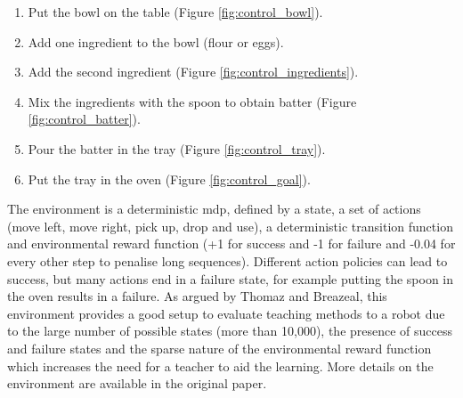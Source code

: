 \begin{enumerate}
	\item Put the bowl on the table (Figure \ref{fig:control_bowl}).
	\item Add one ingredient to the bowl (flour or eggs).
	\item Add the second ingredient (Figure \ref{fig:control_ingredients}).
	\item Mix the ingredients with the spoon to obtain batter (Figure \ref{fig:control_batter}).
	\item Pour the batter in the tray (Figure \ref{fig:control_tray}).
	\item Put the tray in the oven (Figure \ref{fig:control_goal}).
\end{enumerate}

The environment is a deterministic \acrlong{mdp}, defined by a state, a set of actions (move left, move right, pick up, drop and use), a deterministic transition function and environmental reward function (+1 for success and -1 for failure and -0.04 for every other step to penalise long sequences). Different action policies can lead to success, but many actions end in a failure state, for example putting the spoon in the oven results in a failure. As argued by Thomaz and Breazeal, this environment provides a good setup to evaluate teaching methods to a robot due to the large number of possible states (more than 10,000), the presence of success and failure states and the sparse nature of the environmental reward function which increases the need for a teacher to aid the learning. More details on the environment are available in the original paper.

